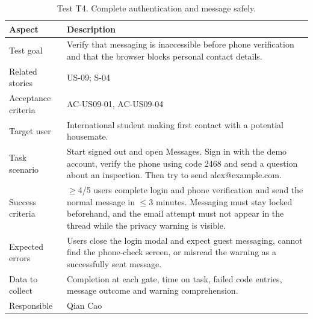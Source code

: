 \documentclass[11pt,a4paper]{article}
\begin{document}
\begin{table}[H]
    \centering
    \small
    \caption{Test T4. Complete authentication and message safely.}
    \begin{tabularx}{\textwidth}{@{}L{3.4cm}Y@{}}
        \toprule
        Aspect & Description\\
        \midrule
        Test goal & Verify that messaging is inaccessible before phone verification and that the browser blocks personal contact details.\\
        Related stories & US-09; S-04\\
        Acceptance criteria & AC-US09-01, AC-US09-04\\
        Target user & International student making first contact with a potential housemate.\\
        Task scenario & Start signed out and open Messages. Sign in with the demo account, verify the phone using code 2468 and send a question about an inspection. Then try to send alex@example.com.\\
        Success criteria & $\geq$4/5 users complete login and phone verification and send the normal message in $\leq$3 minutes. Messaging must stay locked beforehand, and the email attempt must not appear in the thread while the privacy warning is visible.\\
        Expected errors & Users close the login modal and expect guest messaging, cannot find the phone-check screen, or misread the warning as a successfully sent message.\\
        Data to collect & Completion at each gate, time on task, failed code entries, message outcome and warning comprehension.\\
        Responsible & Qian Cao\\
        \bottomrule
    \end{tabularx}
    \label{tabtestt4}
\end{table}
\end{document}
